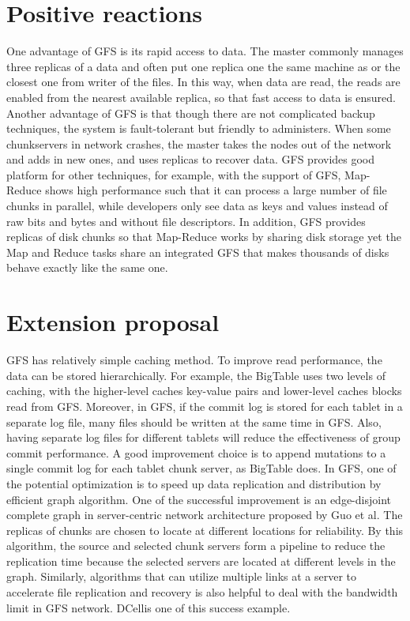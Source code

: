 \documentclass[10pt, letterpaper]{article}
\begin{document}
\section{Positive reactions}
\label{sec-formatting}
One advantage of GFS is its rapid access to data. The master commonly manages three replicas of a data and
often put one replica one the same machine as or the closest one from writer of the files. In this way, when data are read, the reads
are enabled from the nearest available replica, so that fast access to data is ensured. Another advantage of
GFS is that though there are not complicated backup techniques, the system is fault-tolerant but friendly to
administers. When some chunkservers in network crashes, the master takes the nodes out of the network and adds
in new ones, and uses replicas to recover data. GFS provides good platform for other techniques, for example, with the support of GFS,
Map-Reduce shows high performance such that it can process a large number of file chunks in parallel, while
developers only see data as keys and values instead of raw bits and bytes and without file descriptors. In
addition, GFS provides replicas of disk chunks so that Map-Reduce works by sharing disk storage yet the Map and
Reduce tasks share an integrated GFS that makes thousands of disks behave exactly like the same
one.\cite{Yang:2007:MSR:1247480.1247602}
\section{Extension proposal}
GFS has relatively simple caching method. To improve read performance, the data can be stored hierarchically. For
example, the BigTable\cite{Chang:2008:BDS:1365815.1365816} uses two levels of caching, with the higher-level caches key-value pairs and
lower-level caches blocks read from GFS. Moreover, in GFS, if the commit log is stored for each tablet in a separate log
file, many files should be written at the same time in GFS. Also, having separate log files for different
tablets will reduce the effectiveness of group commit performance. A good improvement choice is to append
mutations to a single commit log for each tablet chunk server, as BigTable does.
In GFS, one of the potential optimization is to speed up data replication and distribution by efficient graph
algorithm. One of the successful improvement is an edge-disjoint complete graph in server-centric network
architecture proposed by Guo et al.\cite{guo2009bcube} The replicas of chunks are chosen to locate at different
locations for reliability. By this algorithm, the source and selected chunk servers form a pipeline to reduce
the replication time because the selected servers are located at different levels in the graph. Similarly,
algorithms that can utilize multiple links at a server to accelerate file replication and recovery is also
helpful to deal with the bandwidth limit in GFS network. DCell\cite{Guo:2008:DSF:1402958.1402968}is one of this success example.
\end{document}
